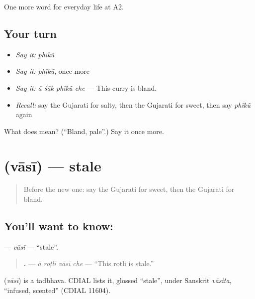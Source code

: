 \begin{grammarlens}[title={What you've built}]
One more word for everyday life at A2.
\end{grammarlens}

\subsection*{Your turn}
\begin{itemize}
\raggedright
  \item \emph{Say it:} \emph{phīkũ}
  \item \emph{Say it:} \emph{phīkũ}, once more
  \item \emph{Say it:} \emph{ā śāk phīkũ che} — This curry is bland.
  \item \emph{Recall:} say the Gujarati for salty, then the Gujarati for sweet, then say \emph{phīkũ} again
\end{itemize}

\begin{tcolorbox}[breakable,colback=teal!4,colframe=teal!35!black,title={Before you move on}]
What does  mean? (\textquotedblleft{}Bland, pale\textquotedblright{}.) Say it once more.
\end{tcolorbox}
\section[\texorpdfstring{\gu{વાસી} (vāsī)}{વાસી (vāsī)}]{ (vāsī) — stale}

\label{lesson:GU-C172-vasi}



\begin{quote}
Before the new one: say the Gujarati for sweet, then the Gujarati for bland.
\end{quote}

\subsection*{You'll want to know: }
\textbf{} — \emph{vāsī} — \textquotedblleft{}stale\textquotedblright{}.

\begin{quote}
\textbf{   .} — \emph{ā roṭlī vāsī che} — \textquotedblleft{}This rotli is stale.\textquotedblright{}
\end{quote}

\begin{cousinweb}
\textbf{} (\emph{vāsī}) is a tadbhava. CDIAL lists it, glossed \textquotedblleft{}stale\textquotedblright{}, under Sanskrit \emph{vāsita}, \textquotedblleft{}infused, scented\textquotedblright{} (CDIAL 11604).
\end{cousinweb}

